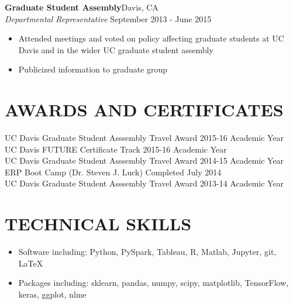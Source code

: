 \documentclass[line,margin,10pt]{res}
\begin{document}
\begin{resume}
\textbf{Graduate Student Assembly}\hfill Davis, CA\\{\sl Departmental Representative} \hfill September 2013 - June 2015
\begin{itemize}
\item Attended meetings and voted on policy affecting graduate students at UC Davis and in the wider UC graduate student assembly
\item Publicized information to graduate group
\end{itemize}
 

\section{AWARDS AND CERTIFICATES}
UC Davis Graduate Student Asssembly Travel Award \hfill 2015-16 Academic Year\\
UC Davis FUTURE Certificate Track \hfill 2015-16 Academic Year\\
UC Davis Graduate Student Asssembly Travel Award \hfill 2014-15 Academic Year\\
ERP Boot Camp (Dr. Steven J. Luck) \hfill Completed July 2014\\
UC Davis Graduate Student Asssembly Travel Award \hfill 2013-14 Academic Year

 \section{TECHNICAL SKILLS} 
 \begin{itemize}[leftmargin=-2pt] \itemsep -2pt
\item [] Software including: Python, PySpark, Tableau, R, Matlab, Jupyter, git, \LaTeX\ %
\item []Packages including: sklearn, pandas, numpy, scipy, matplotlib, TensorFlow, keras, ggplot, nlme
 \end{itemize}


\end{resume}
\end{document}
